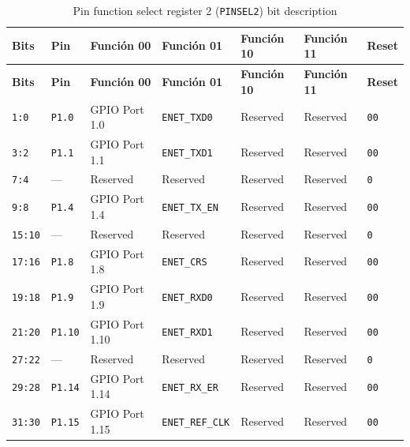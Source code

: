 \begin{longtable}{|>{\raggedright\arraybackslash}p{}|>{\raggedright\arraybackslash}p{}|>{\raggedright\arraybackslash}p{}|>{\raggedright\arraybackslash}p{}|>{\raggedright\arraybackslash}p{}|>{\raggedright\arraybackslash}p{}|>{\centering\arraybackslash}p{}|}
\caption{Pin function select register 2 (\texttt{PINSEL2}) bit description}\\
\hline
\textbf{Bits} & \textbf{Pin} & \textbf{Función 00} & \textbf{Función 01} & \textbf{Función 10} & \textbf{Función 11} & \textbf{Reset} \\
\hline
\endfirsthead
\hline
\textbf{Bits} & \textbf{Pin} & \textbf{Función 00} & \textbf{Función 01} & \textbf{Función 10} & \textbf{Función 11} & \textbf{Reset} \\
\hline
\endhead
\texttt{1:0} & \texttt{P1.0} & GPIO Port 1.0 & \texttt{ENET\_TXD0} & Reserved & Reserved & \texttt{00} \\
\hline
\texttt{3:2} & \texttt{P1.1} & GPIO Port 1.1 & \texttt{ENET\_TXD1} & Reserved & Reserved & \texttt{00} \\
\hline
\texttt{7:4} & --- & Reserved & Reserved & Reserved & Reserved & \texttt{0} \\
\hline
\texttt{9:8} & \texttt{P1.4} & GPIO Port 1.4 & \texttt{ENET\_TX\_EN} & Reserved & Reserved & \texttt{00} \\
\hline
\texttt{15:10} & --- & Reserved & Reserved & Reserved & Reserved & \texttt{0} \\
\hline
\texttt{17:16} & \texttt{P1.8} & GPIO Port 1.8 & \texttt{ENET\_CRS} & Reserved & Reserved & \texttt{00} \\
\hline
\texttt{19:18} & \texttt{P1.9} & GPIO Port 1.9 & \texttt{ENET\_RXD0} & Reserved & Reserved & \texttt{00} \\
\hline
\texttt{21:20} & \texttt{P1.10} & GPIO Port 1.10 & \texttt{ENET\_RXD1} & Reserved & Reserved & \texttt{00} \\
\hline
\texttt{27:22} & --- & Reserved & Reserved & Reserved & Reserved & \texttt{0} \\
\hline
\texttt{29:28} & \texttt{P1.14} & GPIO Port 1.14 & \texttt{ENET\_RX\_ER} & Reserved & Reserved & \texttt{00} \\
\hline
\texttt{31:30} & \texttt{P1.15} & GPIO Port 1.15 & \texttt{ENET\_REF\_CLK} & Reserved & Reserved & \texttt{00} \\
\hline
\end{longtable}

